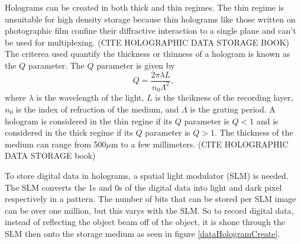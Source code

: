 \documentclass[ aip, 12pt]{revtex4-1} %
\begin{document}
Holograms can be created in both thick and thin regimes. The thin regime is unsuitable for high density storage because thin holograms like those written on photographic film confine their diffractive interaction to a single plane and can't be used for multiplexing. (CITE HOLOGRAPHIC DATA STORAGE BOOK) The criterea used quantify the thickness or thinness of a hologram is known as the $Q$ parameter. The $Q$ parameter is given by 
\begin{equation}
Q = \frac{2\pi\lambda L}{n_0\Lambda^2},
\label{qParameter}
\end{equation}
where $\lambda$ is the wavelength of the light, $L$ is the thcikness of the recording layer, $n_0$ is the index of refraction of the medium, and $\Lambda$ is the grating period. A hologram is considered in the thin regine if its $Q$ parameter is $Q<1$ and is considered in the thick regime if its $Q$ parameter is $Q>1$. The thickness of the medium can range from 500$\mu$m to a few millimeters. (CITE HOLOGRAPHIC DATA STORAGE book)

To store digital data in holograms, a spatial light modulator (SLM) is needed. The SLM converts the 1s and 0s of the digital data into light and dark pixel respectively in a pattern. The number of bits that can be stored per SLM image can be over one million, but this varys with the SLM. So to record digital data, instead of reflecting the object beam off of the object, it is shone through the SLM then onto the storage medium as seen in figure \ref{dataHologramCreate}. 
\end{document}
